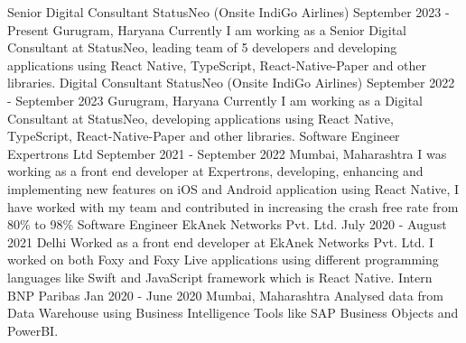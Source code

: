

\begin{cventries}

\cventry
    {Senior Digital Consultant} %
    {StatusNeo (Onsite IndiGo Airlines)} %
    {September 2023 - Present} %
    {Gurugram, Haryana} %
    {
        Currently I am working as a Senior Digital Consultant at StatusNeo, leading team of 5 developers and developing applications using React Native, TypeScript, React-Native-Paper and other libraries.
    }
\vspace{1.0em}
\cventry
    {Digital Consultant} %
    {StatusNeo (Onsite IndiGo Airlines)} %
    {September 2022 - September 2023} %
    {Gurugram, Haryana} %
    {
        Currently I am working as a Digital Consultant at StatusNeo, developing applications using React Native, TypeScript, React-Native-Paper and other libraries.
    }
\vspace{1.0em}
\cventry
    {Software Engineer} %
    {Expertrons Ltd} %
    {September 2021 - September 2022} %
    {Mumbai, Maharashtra} %
    {
        I was working as a front end developer at Expertrons, developing, enhancing and implementing new features on iOS and Android application using React Native, I have worked with my team and contributed in increasing the crash free rate from 80\% to 98\%
    }
\vspace{1.0em}
\cventry
    {Software Engineer} %
    {EkAnek Networks Pvt. Ltd.} %
    {July 2020 - August 2021} %
    {Delhi} %
    {
        Worked as a front end developer at EkAnek Networks Pvt. Ltd. I worked on both Foxy and Foxy Live applications using different programming languages like Swift and JavaScript framework which is React Native.
    }
\vspace{1.0em}
\cventry
    {Intern} %
    {BNP Paribas} %
    {Jan 2020 - June 2020} %
    {Mumbai, Maharashtra} %
    {
        Analysed data from Data Warehouse using Business Intelligence Tools like SAP Business Objects and PowerBI.
}
\end{cventries}
